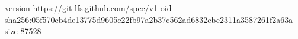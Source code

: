 version https://git-lfs.github.com/spec/v1
oid sha256:05f570eb4de13775d9605c22fb97a2b37c562ad6832cbc2311a3587261f2a63a
size 87528
